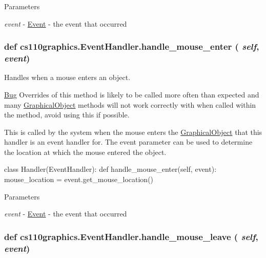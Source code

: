 \begin{DoxyParams}{Parameters}
\item[{\em event}]-\/ \hyperlink{classcs110graphics_1_1Event}{Event} -\/ the event that occurred \end{DoxyParams}
\hypertarget{classcs110graphics_1_1EventHandler_a13af3268f8a1aa36b8483eb2deffef15}{
\subsubsection[{handle\_\-mouse\_\-enter}]{\setlength{\rightskip}{0pt plus 5cm}def cs110graphics.EventHandler.handle\_\-mouse\_\-enter ( {\em self}, \/   {\em event})}}
\label{classcs110graphics_1_1EventHandler_a13af3268f8a1aa36b8483eb2deffef15}


Handles when a mouse enters an object. \begin{Desc}
\item[\hyperlink{bug__bug000001}{Bug}]Overrides of this method is likely to be called more often than expected and many \hyperlink{classcs110graphics_1_1GraphicalObject}{GraphicalObject} methods will not work correctly with when called within the method, avoid using this if possible.\end{Desc}
This is called by the system when the mouse enters the \hyperlink{classcs110graphics_1_1GraphicalObject}{GraphicalObject} that this handler is an event handler for. The event parameter can be used to determine the location at which the mouse entered the object. 
\begin{DoxyCode}
 class Handler(EventHandler):
     def handle_mouse_enter(self, event):
         mouse_location = event.get_mouse_location()
\end{DoxyCode}
 
\begin{DoxyParams}{Parameters}
\item[{\em event}]-\/ \hyperlink{classcs110graphics_1_1Event}{Event} -\/ the event that occurred \end{DoxyParams}
\hypertarget{classcs110graphics_1_1EventHandler_a5deaf2b6b8055e97ac0ddf6603132c64}{
\subsubsection[{handle\_\-mouse\_\-leave}]{\setlength{\rightskip}{0pt plus 5cm}def cs110graphics.EventHandler.handle\_\-mouse\_\-leave ( {\em self}, \/   {\em event})}}
\label{classcs110graphics_1_1EventHandler_a5deaf2b6b8055e97ac0ddf6603132c64}


